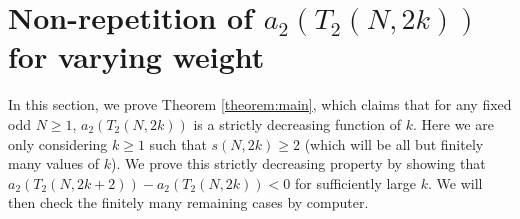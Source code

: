 \documentclass[11pt,letterpaper,reqno]{amsart}
\numberwithin{figure}{section}
\numberwithin{table}{section}
\theoremstyle{definition}
\theoremstyle{plain}
\theoremstyle{definition}
\theoremstyle{definition}
\theoremstyle{remark}
\numberwithin{equation}{section}
\begin{document}
\section{Non-repetition of \texorpdfstring{$a_2(T_2(N,2k))$}{a2(T2(N,2k))} for varying weight}\label{sect:T2nonrepetition}


In this section, we prove Theorem \ref{theorem:main}, which claims that for any fixed odd $N \geq 1$, $a_2(T_2(N, 2k))$ is a strictly decreasing function of $k$. Here we are only considering $k \ge 1$ such that $s(N,2k) \ge 2$ (which will be all but finitely many values of $k$). 
We prove this strictly decreasing property by showing that $a_2(T_2(N, 2k+2)) - a_2(T_2(N, 2k)) < 0$ for sufficiently large $k$. We will then check the finitely many remaining cases by computer.
\end{document}
